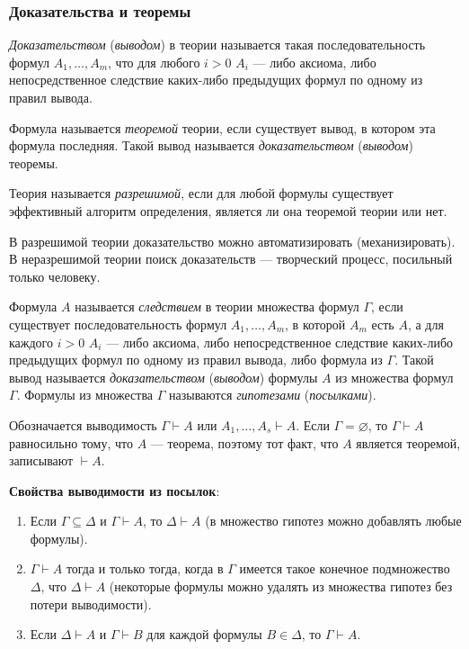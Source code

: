 \subsubsection{Доказательства и теоремы}
\begin{definition*}
    \textit{Доказательством} (\textit{выводом}) в теории называется такая последовательность формул $A_1, \dots, A_m$, что для любого $i  > 0$ $A_i$ --- либо аксиома, либо непосредственное следствие каких-либо предыдущих формул по одному из правил вывода.
\end{definition*}
\begin{definition*}
    Формула называется \textit{теоремой} теории, если существует вывод, в котором эта формула последняя. Такой вывод называется \textit{доказательством} (\textit{выводом}) теоремы. 
\end{definition*}
\begin{definition*}
    Теория называется \textit{разрешимой}, если для любой формулы существует эффективный алгоритм определения, является ли она теоремой теории или нет.
\end{definition*}
В разрешимой теории доказательство можно автоматизировать (механизировать). В неразрешимой теории поиск доказательств --- творческий процесс, посильный только человеку.
\begin{definition*}
    Формула $A$ называется \textit{следствием} в теории множества формул $\Gamma$, если существует последовательность формул $A_1, \dots, A_m$, в которой $A_m$ есть $A$, а для каждого $i > 0$ $A_i$ --- либо аксиома, либо непосредственное следствие каких-либо предыдущих формул по одному из правил вывода, либо формула из $\Gamma$. Такой вывод называется \textit{доказательством} (\textit{выводом}) формулы $A$ из множества формул $\Gamma$. Формулы из множества $\Gamma$ называются \textit{гипотезами} (\textit{посылками}).
\end{definition*}
Обозначается выводимость $\Gamma \vdash A$ или $A_1, \dots, A_s \vdash A$. Если $\Gamma = \varnothing$, то $\Gamma \vdash A$ равносильно тому, что $A$ --- теорема, поэтому тот факт, что $A$ является теоремой, записывают $\vdash A$.

\textbf{Свойства выводимости из посылок}:
\begin{enumerate}
    \item Если $\Gamma \subseteq \Delta$ и $\Gamma \vdash A$, то $\Delta \vdash A$ (в множество гипотез можно добавлять любые формулы).
    \item $\Gamma \vdash A$ тогда и только тогда, когда в $\Gamma$ имеется такое конечное подмножество $\Delta$, что $\Delta \vdash A$ (некоторые формулы можно удалять из множества гипотез без потери выводимости).
    \item Если $\Delta \vdash A$ и $\Gamma \vdash B$ для каждой формулы $B \in \Delta$, то $\Gamma \vdash A$.
\end{enumerate}